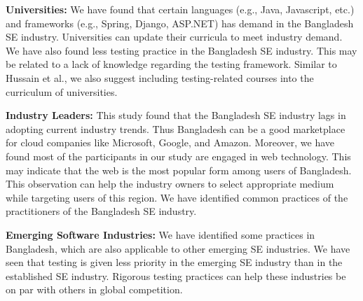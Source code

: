 \indent \textbf{Universities:} We have found that certain languages (e.g., Java, Javascript, etc.) and frameworks (e.g., Spring, Django, ASP.NET) has demand in the Bangladesh SE industry. Universities can update their curricula to meet industry demand. We have also found less testing practice in the Bangladesh SE industry. This may be related to a lack of knowledge regarding the testing framework. Similar to  Hussain et al.\cite{Hussain2020}, we also suggest including testing-related courses into the curriculum of universities.


\indent \textbf{Industry Leaders:} This study found that the Bangladesh SE industry lags in adopting current industry trends. Thus Bangladesh can be a good marketplace for cloud companies like Microsoft, Google, and Amazon. Moreover, we have found most of the participants in our study are engaged in web technology. This may indicate that the web is the most popular form among users of Bangladesh. This observation can help the industry owners to select appropriate medium while targeting users of this region. We have identified common practices of the practitioners of the Bangladesh SE industry.


\indent \textbf{Emerging Software Industries:} We have identified some practices in Bangladesh, which are also applicable to other emerging SE industries. We have seen that testing is given less priority in the emerging SE industry than in the established SE industry. Rigorous testing practices can help these industries be on par with others in global competition.
